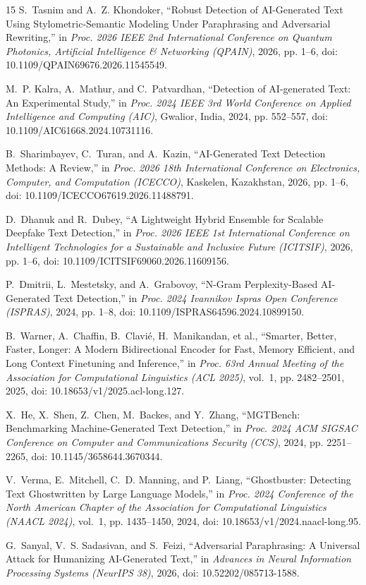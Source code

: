\documentclass[conference]{IEEEtran}
\begin{document}
\begin{thebibliography}{15}
S.~Tasnim and A.~Z. Khondoker, ``Robust Detection of AI-Generated Text Using Stylometric-Semantic Modeling Under Paraphrasing and Adversarial Rewriting,'' in \emph{Proc. 2026 IEEE 2nd International Conference on Quantum Photonics, Artificial Intelligence \& Networking (QPAIN)}, 2026, pp. 1--6, doi: 10.1109/QPAIN69676.2026.11545549.

M.~P. Kalra, A.~Mathur, and C.~Patvardhan, ``Detection of AI-generated Text: An Experimental Study,'' in \emph{Proc. 2024 IEEE 3rd World Conference on Applied Intelligence and Computing (AIC)}, Gwalior, India, 2024, pp. 552--557, doi: 10.1109/AIC61668.2024.10731116.

B.~Sharimbayev, C.~Turan, and A.~Kazin, ``AI-Generated Text Detection Methods: A Review,'' in \emph{Proc. 2026 18th International Conference on Electronics, Computer, and Computation (ICECCO)}, Kaskelen, Kazakhstan, 2026, pp. 1--6, doi: 10.1109/ICECCO67619.2026.11488791.

D.~Dhanuk and R.~Dubey, ``A Lightweight Hybrid Ensemble for Scalable Deepfake Text Detection,'' in \emph{Proc. 2026 IEEE 1st International Conference on Intelligent Technologies for a Sustainable and Inclusive Future (ICITSIF)}, 2026, pp. 1--6, doi: 10.1109/ICITSIF69060.2026.11609156.

P.~Dmitrii, L.~Mestetsky, and A.~Grabovoy, ``N-Gram Perplexity-Based AI-Generated Text Detection,'' in \emph{Proc. 2024 Ivannikov Ispras Open Conference (ISPRAS)}, 2024, pp. 1--8, doi: 10.1109/ISPRAS64596.2024.10899150.

B.~Warner, A.~Chaffin, B.~Clavi\'{e}, H.~Manikandan, et al., ``Smarter, Better, Faster, Longer: A Modern Bidirectional Encoder for Fast, Memory Efficient, and Long Context Finetuning and Inference,'' in \emph{Proc. 63rd Annual Meeting of the Association for Computational Linguistics (ACL 2025)}, vol.~1, pp. 2482--2501, 2025, doi: 10.18653/v1/2025.acl-long.127.

X.~He, X.~Shen, Z.~Chen, M.~Backes, and Y.~Zhang, ``MGTBench: Benchmarking Machine-Generated Text Detection,'' in \emph{Proc. 2024 ACM SIGSAC Conference on Computer and Communications Security (CCS)}, 2024, pp. 2251--2265, doi: 10.1145/3658644.3670344.

V.~Verma, E.~Mitchell, C.~D. Manning, and P.~Liang, ``Ghostbuster: Detecting Text Ghostwritten by Large Language Models,'' in \emph{Proc. 2024 Conference of the North American Chapter of the Association for Computational Linguistics (NAACL 2024)}, vol.~1, pp. 1435--1450, 2024, doi: 10.18653/v1/2024.naacl-long.95.

G.~Sanyal, V.~S. Sadasivan, and S.~Feizi, ``Adversarial Paraphrasing: A Universal Attack for Humanizing AI-Generated Text,'' in \emph{Advances in Neural Information Processing Systems (NeurIPS 38)}, 2026, doi: 10.52202/085713-1588.
\end{thebibliography}
\end{document}
